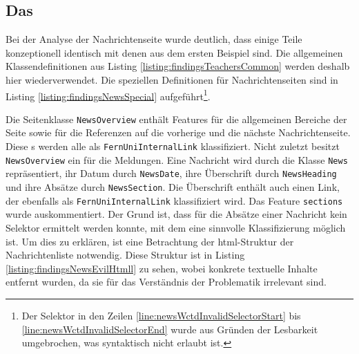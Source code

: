 \subsection{Das {\classificationModel}}
    \label{section:findingsNewsClasses}
    Bei der Analyse der Nachrichtenseite wurde deutlich,
    dass einige Teile konzeptionell identisch mit denen aus dem ersten Beispiel sind.
    Die allgemeinen Klassendefinitionen aus Listing \ref{listing:findingsTeachersCommon}
    werden deshalb hier wiederverwendet.
    Die speziellen Definitionen für Nachrichtenseiten sind in
    Listing \ref{listing:findingsNewsSpecial}
    aufgeführt\footnote{Der Selektor in den Zeilen \ref{line:newsWctdInvalidSelectorStart}
    bis \ref{line:newsWctdInvalidSelectorEnd} wurde aus Gründen der Lesbarkeit umgebrochen,
    was syntaktisch nicht erlaubt ist.}.

    

    Die Seitenklasse \texttt{NewsOverview} enthält Features für die
    allgemeinen Bereiche der Seite sowie für die Referenzen auf die vorherige und die nächste
    Nachrichtenseite. Diese {}s werden alle als \texttt{FernUniInternalLink} klassifiziert.
    Nicht zuletzt besitzt \texttt{NewsOverview} ein {\collectionFeature} für die Meldungen.
    Eine Nachricht wird durch die Klasse \texttt{News} repräsentiert,
    ihr Datum durch \texttt{NewsDate}, ihre Überschrift durch \texttt{NewsHeading}
    und ihre Absätze durch \texttt{NewsSection}.
    Die Überschrift enthält auch einen Link,
    der ebenfalls als \texttt{FernUniInternalLink} klassifiziert wird.
    Das Feature \texttt{sections} wurde auskommentiert.
    Der Grund ist, dass für die Absätze einer Nachricht kein Selektor ermittelt werden konnte,
    mit dem eine sinnvolle Klassifizierung möglich ist.
    Um dies zu erklären, ist eine Betrachtung der \gls{html}-Struktur der Nachrichtenliste notwendig.
    Diese Struktur ist in Listing \ref{listing:findingsNewsEvilHtmll}
    zu sehen, wobei konkrete textuelle Inhalte entfernt wurden,
    da sie für das Verständnis der Problematik irrelevant sind.

    

